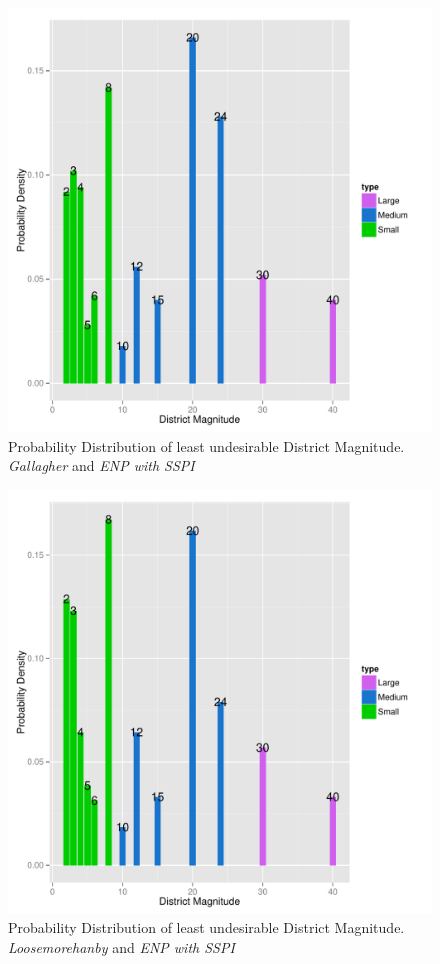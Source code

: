 \documentclass{article}
\begin{document}
\begin{figure}[]
\includegraphics[scale=1.00]{images/gallagher_enpsspi_tradeoff_overall_small.pdf}
\caption{Probability Distribution of least undesirable District Magnitude. \emph {Gallagher} and \emph{ENP with SSPI}}
\label{fig:optimal_results_small_sspi}
\end{figure}

\begin{figure}[]
\includegraphics[scale=1.00]{images/loosemorehanby_enp_tradeoff_overall_small.pdf}
\caption{Probability Distribution of least undesirable District Magnitude. \emph {Loosemorehanby} and \emph{ENP with SSPI}}
\label{fig:optimal_results_small_loosemorehanby}
\end{figure}
\end{document}
